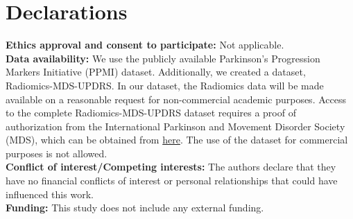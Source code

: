 \documentclass{article}
\begin{document}
\section*{Declarations}
\noindent
\textbf{Ethics approval and consent to participate:} Not applicable. \\
\textbf{Data availability:}  We use the publicly available Parkinson's Progression Markers Initiative (PPMI) \cite{marek2011parkinson} dataset. Additionally, we created a dataset, Radiomics-MDS-UPDRS. In our dataset, the Radiomics data will be made available on a reasonable request for non-commercial academic purposes. Access to the complete Radiomics-MDS-UPDRS dataset requires a proof of authorization from the International Parkinson and Movement Disorder Society (MDS), which can be obtained from
\href{https://mds.movementdisorders.org/publications/rating_scales/request_form.php}{here}.  The use of the dataset for commercial purposes is not allowed. \\
\textbf{Conflict of interest/Competing interests:} The authors declare that they have no financial conflicts of interest or personal relationships that could have influenced this work.\\
\textbf{Funding:} This study does not include any external funding.
\end{document}
